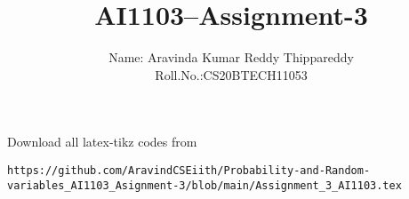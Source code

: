\documentclass[journal,12pt,twocolumn]{IEEEtran}
\DeclareMathOperator*{\Res}{Res}
\begin{document}
\newcommand{\BEQA}{\begin{eqnarray}}
\newcommand{\EEQA}{\end{eqnarray}}
\newcommand{\define}{\stackrel{\triangle}{=}}

\raggedbottom
\setlength{\parindent}{0pt}
\providecommand{\mbf}{\mathbf}
\providecommand{\pr}[1]{\ensuremath{\Pr\left(#1\right)}}
\providecommand{\qfunc}[1]{\ensuremath{Q\left(#1\right)}}
\providecommand{\sbrak}[1]{\ensuremath{{}\left[#1\right]}}
\providecommand{\lsbrak}[1]{\ensuremath{{}\left[#1\right.}}
\providecommand{\rsbrak}[1]{\ensuremath{{}\left.#1\right]}}
\providecommand{\brak}[1]{\ensuremath{\left(#1\right)}}
\providecommand{\lbrak}[1]{\ensuremath{\left(#1\right.}}
\providecommand{\rbrak}[1]{\ensuremath{\left.#1\right)}}
\providecommand{\cbrak}[1]{\ensuremath{\left\{#1\right\}}}
\providecommand{\lcbrak}[1]{\ensuremath{\left\{#1\right.}}
\providecommand{\rcbrak}[1]{\ensuremath{\left.#1\right\}}}
\theoremstyle{remark}
\newtheorem{rem}{Remark}
\newcommand{\sgn}{\mathop{\mathrm{sgn}}}
\providecommand{\abs}[1]{\vert#1\vert}
\providecommand{\res}[1]{\Res\displaylimits_{#1}} 
\providecommand{\norm}[1]{\lVert#1\rVert}
\providecommand{\mtx}[1]{\mathbf{#1}}
\providecommand{\mean}[1]{E[ #1 ]}
\providecommand{\fourier}{\overset{\mathcal{F}}{ \rightleftharpoons}}
\providecommand{\system}{\overset{\mathcal{H}}{ \longleftrightarrow}}
\newcommand{\solution}{\noindent \textbf{Solution: }}
\newcommand{\cosec}{\,\text{cosec}\,}
\providecommand{\dec}[2]{\ensuremath{\overset{#1}{\underset{#2}{\gtrless}}}}
\newcommand{\myvec}[1]{\ensuremath{\begin{pmatrix}#1\end{pmatrix}}}
\newcommand{\mydet}[1]{\ensuremath{\begin{vmatrix}#1\end{vmatrix}}}
\makeatletter
{}
\makeatother
\let\StandardTheFigure\thefigure
\let\vec\mathbf
\renewcommand{\thefigure}{\theproblem}
\def\putbox#1#2#3{\makebox[0in][l]{\makebox[#1][l]{}\raisebox{\baselineskip}[0in][0in]{\raisebox{#2}[0in][0in]{#3}}}}
     \def\rightbox#1{\makebox[0in][r]{#1}}
     \def\centbox#1{\makebox[0in]{#1}}
     \def\topbox#1{\raisebox{-\baselineskip}[0in][0in]{#1}}
     \def\midbox#1{\raisebox{-0.5\baselineskip}[0in][0in]{#1}}
\vspace{3cm}
\title{AI1103--Assignment-3}
\author{Name: Aravinda Kumar Reddy Thippareddy\\Roll.No.:CS20BTECH11053}
\maketitle
\newpage
\bigskip
\renewcommand{\thefigure}{\theenumi}
\renewcommand{\thetable}{\theenumi}
Download all latex-tikz codes from
%
\begin{lstlisting}
https://github.com/AravindCSEiith/Probability-and-Random-variables_AI1103_Asignment-3/blob/main/Assignment_3_AI1103.tex
\end{lstlisting}
\end{document}
